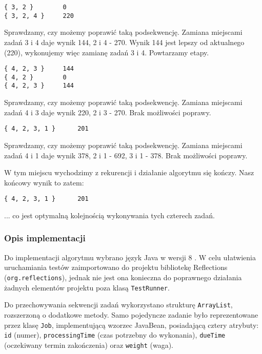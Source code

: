 \documentclass[polish,polish,a4paper]{article}
\begin{document}
\begin{lstlisting}
{ 3, 2 }		0
{ 3, 2, 4 }		220
\end{lstlisting}

Sprawdzamy, czy możemy poprawić taką podsekwencję. Zamiana miejscami zadań 3 i 4 daje wynik 144, 2 i 4 - 270. Wynik 144 jest lepszy od aktualnego (220), wykonujemy więc zamianę zadań 3 i 4. Powtarzamy etapy.

\begin{lstlisting}
{ 4, 2, 3 }		144
{ 4, 2 }		0
{ 4, 2, 3 }		144
\end{lstlisting}

Sprawdzamy, czy możemy poprawić taką podsekwencję. Zamiana miejscami zadań 4 i 3 daje wynik 220, 2 i 3 - 270. Brak możliwości poprawy.

\begin{lstlisting}
{ 4, 2, 3, 1 }		201
\end{lstlisting}

Sprawdzamy, czy możemy poprawić taką podsekwencję. Zamiana miejscami zadań 4 i 1 daje wynik 378, 2 i 1 - 692, 3 i 1 - 378. Brak możliwości poprawy.

W tym miejscu wychodzimy z rekurencji i działanie algorytmu się kończy. Nasz końcowy wynik to zatem:

\begin{lstlisting}
{ 4, 2, 3, 1 }		201
\end{lstlisting}

... co jest optymalną kolejnością wykonywania tych czterech zadań.

\lstset{style=defaultStyle}
\subsubsection{Opis implementacji}

Do implementacji algorytmu wybrano język Java w wersji 8 \cite{JavaDocs}. W celu ułatwienia uruchamiania testów zaimportowano do projektu bibliotekę Reflections (\texttt{org.reflections}), jednak nie jest ona konieczna do poprawnego działania żadnych elementów projektu poza klasą \texttt{TestRunner}.

Do przechowywania sekwencji zadań wykorzystano strukturę \texttt{ArrayList}, rozszerzoną o dodatkowe metody. Samo pojedyncze zadanie było reprezentowane przez klasę \texttt{Job}, implementującą wzorzec JavaBean, posiadającą cztery atrybuty: \texttt{id} (numer), \texttt{processingTime} (czas potrzebny do wykonania), \texttt{dueTime} (oczekiwany termin zakończenia) oraz \texttt{weight} (waga).
\end{document}
